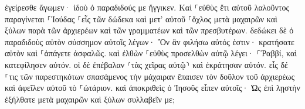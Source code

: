 \documentclass{openreader}
\begin{document}
ἐγείρεσθε ἄγωμεν· ἰδοὺ ὁ παραδιδούς με ἤγγικεν. 
Καὶ ⸀εὐθὺς ἔτι αὐτοῦ λαλοῦντος παραγίνεται ⸀Ἰούδας ⸀εἷς τῶν δώδεκα καὶ μετ’ αὐτοῦ ⸀ὄχλος μετὰ μαχαιρῶν καὶ ξύλων παρὰ τῶν ἀρχιερέων καὶ τῶν γραμματέων καὶ τῶν πρεσβυτέρων. 
δεδώκει δὲ ὁ παραδιδοὺς αὐτὸν σύσσημον αὐτοῖς λέγων· Ὃν ἂν φιλήσω αὐτός ἐστιν· κρατήσατε αὐτὸν καὶ ⸀ἀπάγετε ἀσφαλῶς. 
καὶ ἐλθὼν ⸀εὐθὺς προσελθὼν αὐτῷ λέγει· ⸀Ῥαββί, καὶ κατεφίλησεν αὐτόν. 
οἱ δὲ ἐπέβαλαν ⸂τὰς χεῖρας αὐτῷ⸃ καὶ ἐκράτησαν αὐτόν. 
εἷς δέ ⸀τις τῶν παρεστηκότων σπασάμενος τὴν μάχαιραν ἔπαισεν τὸν δοῦλον τοῦ ἀρχιερέως καὶ ἀφεῖλεν αὐτοῦ τὸ ⸀ὠτάριον. 
καὶ ἀποκριθεὶς ὁ Ἰησοῦς εἶπεν αὐτοῖς· Ὡς ἐπὶ λῃστὴν ἐξήλθατε μετὰ μαχαιρῶν καὶ ξύλων συλλαβεῖν με; 
\end{document}
